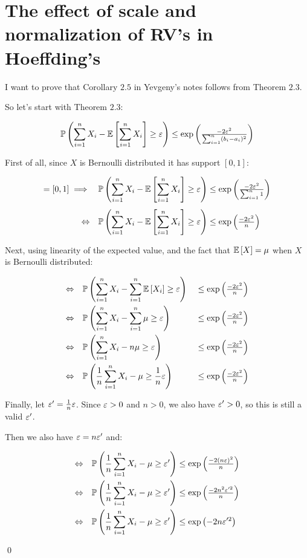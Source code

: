 \section{The effect of scale and normalization of RV's in Hoeffding's}

I want to prove that Corollary $2.5$ in Yevgeny's notes follows from Theorem
$2.3$.

So let's start with Theorem $2.3$:

\newcommand{\sn}{\sum_{i = 1}^n X_i}
\newcommand{\e}[1]{\text{exp}\left(#1\right)}
\begin{align*}
  \PP{\sn - \EE{\sn} \geq \eps} \leq \e{\tfrac{-2\eps^2}{\sum_{i = 1}^n (b_i -
  a_i)^2}}
\end{align*}

First of all, since $X$ is Bernoulli distributed it has support $[0, 1]$:


\begin{align*}
  [a_i, b_i] = [0, 1] \implies\quad &\PP{\sn - \EE{\sn} \geq \eps} \leq
  \e{\tfrac{-2\eps^2}{\sum_{i = 1}^n 1}}\\[4pt]
  \Leftrightarrow\quad &\PP{\sn - \EE{\sn} \geq \eps} \leq
  \e{\tfrac{-2\eps^2}{n}}
\end{align*}

Next, using linearity of the expected value, and the fact that $\mathbb E \left[X\right] = \mu$
when $X$ is Bernoulli distributed:

\begin{alignat*}{3}
  \Leftrightarrow\quad &\PP{\sn - \sum_{i = 1}^n \EE{X_i} \geq \eps} \ &\leq
  \e{\tfrac{-2\eps^2}{n}}\\
  \Leftrightarrow\quad &\PP{\sn - \sum_{i = 1}^n \mu \geq \eps} \ &\leq
  \e{\tfrac{-2\eps^2}{n}}\\
  \Leftrightarrow\quad &\PP{\sn - n \mu \geq \eps} \ &\leq
  \e{\tfrac{-2\eps^2}{n}}\\
  \Leftrightarrow\quad &\PP{\frac{1}{n}\sn - \mu \geq \frac{1}{n}\eps} \ &\leq
  \e{\tfrac{-2\eps^2}{n}}
\end{alignat*}


\noindent Finally, let $\varepsilon' = \tfrac{1}{n}\varepsilon$. Since $\varepsilon > 0$ and $n > 0$, we also
have $\varepsilon' > 0$, so this is still a valid $\varepsilon'$. 

Then we also have $\varepsilon = n \varepsilon'$ and:

\begin{align*}
  \Leftrightarrow\quad &\PP{\frac{1}{n}\sn - \mu \geq \eps'} \leq
  \e{\tfrac{-2(n \eps)^2}{n}}\\
  \Leftrightarrow\quad &\PP{\frac{1}{n}\sn - \mu \geq \eps'} \leq
  \e{\tfrac{-2n^2\eps'^2}{n}}\\
  \Leftrightarrow\quad &\PP{\frac{1}{n}\sn - \mu \geq \eps'} \leq
  \e{-2n\eps'^2}
\end{align*}

\qed

\sectend
